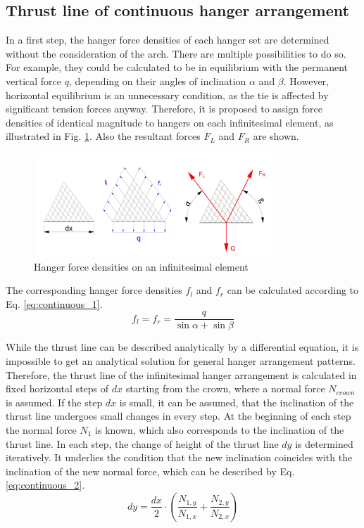 \subsection{Thrust line of continuous hanger arrangement}\label{app:continuous}
In a first step, the hanger force densities of each hanger set are determined without the consideration of the arch. There are multiple possibilities to do so. For example, they could be calculated to be in equilibrium with the permanent vertical force $q$, depending on their angles of inclination $\alpha$ and $\beta$. However, horizontal equilibrium is an unnecessary condition, as the tie is affected by significant tension forces anyway. Therefore, it is proposed to assign force densities of identical magnitude to hangers on each infinitesimal element, as illustrated in Fig. \cref{fig:continuous_1}. Also the resultant forces $F_L$ and $F_R$ are shown.
\begin{figure}[H]
    \centering
    \includegraphics[width=0.8\textwidth]{overleaf/Appendix/Pictures/continuous_thrust_line_1.PNG}
    \caption{Hanger force densities on an infinitesimal element}
    \label{fig:continuous_1}
\end{figure}

The corresponding hanger force densities $f_l$ and $f_r$ can be calculated according to Eq. \eqref{eq:continuous_1}.
\begin{equation}
    f_l=f_r=\frac{q}{\sin{\alpha}+ \sin{\beta}}
    \label{eq:continuous_1}
\end{equation}

While the thrust line can be described analytically by a differential equation, it is impossible to get an analytical solution for general hanger arrangement patterns. Therefore, the thrust line of the infinitesimal hanger arrangement is calculated in fixed horizontal steps of $dx$ starting from the crown, where a normal force $N_{crown}$ is assumed. If the step $dx$ is small, it can be assumed, that the inclination of the thrust line undergoes small changes in every step. At the beginning of each step the normal force $N_1$ is known, which also corresponds to the inclination of the thrust line. In each step, the change of height of the thrust line $dy$ is determined iteratively. It underlies the condition that the new inclination coincides with the inclination of the new normal force, which can be described by Eq. \cref{eq:continuous_2}.
\begin{equation}
    dy = \frac{dx}{2} \cdot \left(\frac{N_{1,y}}{N_{1,x}} + \frac{N_{2,y}}{N_{2,x}} \right)
    \label{eq:continuous_2}
\end{equation}

